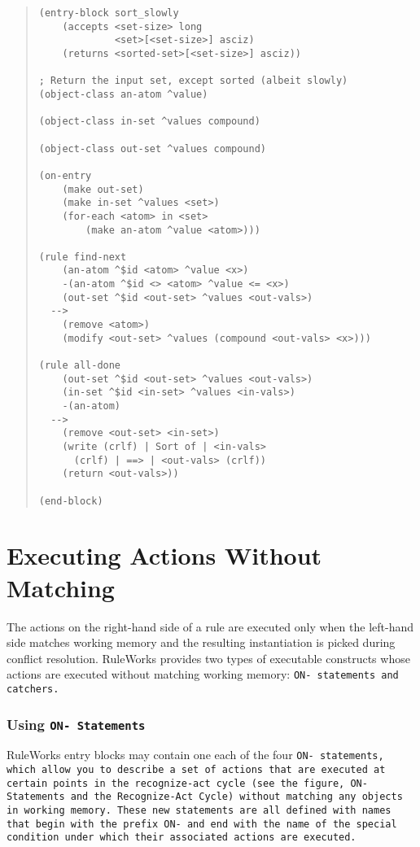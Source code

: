 \begin{quote}
\begin{verbatim}
(entry-block sort_slowly
    (accepts <set-size> long
             <set>[<set-size>] asciz)
    (returns <sorted-set>[<set-size>] asciz))

; Return the input set, except sorted (albeit slowly)
(object-class an-atom ^value)

(object-class in-set ^values compound)

(object-class out-set ^values compound)

(on-entry
    (make out-set)
    (make in-set ^values <set>)
    (for-each <atom> in <set>
        (make an-atom ^value <atom>)))

(rule find-next
    (an-atom ^$id <atom> ^value <x>)
    -(an-atom ^$id <> <atom> ^value <= <x>)
    (out-set ^$id <out-set> ^values <out-vals>)
  -->
    (remove <atom>)
    (modify <out-set> ^values (compound <out-vals> <x>)))

(rule all-done
    (out-set ^$id <out-set> ^values <out-vals>)
    (in-set ^$id <in-set> ^values <in-vals>)
    -(an-atom)
  -->
    (remove <out-set> <in-set>)
    (write (crlf) | Sort of | <in-vals>
      (crlf) | ==> | <out-vals> (crlf))
    (return <out-vals>))

(end-block)
\end{verbatim}
\end{quote}

\section{Executing Actions Without Matching}

The actions on the right-hand side of a rule are executed only when
the left-hand side matches working memory and the resulting
instantiation is picked during conflict resolution. RuleWorks provides
two types of executable constructs whose actions are executed without
matching working memory: \tt{ON-} statements and catchers.

\subsubsection{Using \tt{ON-} Statements}

RuleWorks entry blocks may contain one each of the four \tt{ON-}
statements, which allow you to describe a set of actions that are
executed at certain points in the recognize-act cycle (see the figure,
\tt{ON-} Statements and the Recognize-Act Cycle) without matching
any objects in working memory. These new statements are all defined
with names that begin with the prefix \tt{ON-} and end with the name
of the special condition under which their associated actions are
executed.

